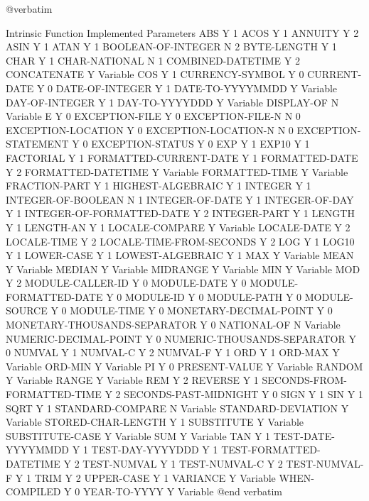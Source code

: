 @verbatim

Intrinsic Function		Implemented	Parameters
ABS				Y		1
ACOS				Y		1
ANNUITY				Y		2
ASIN				Y		1
ATAN				Y		1
BOOLEAN-OF-INTEGER		N		2
BYTE-LENGTH			Y		1
CHAR				Y		1
CHAR-NATIONAL			N		1
COMBINED-DATETIME		Y		2
CONCATENATE			Y		Variable
COS				Y		1
CURRENCY-SYMBOL			Y		0
CURRENT-DATE			Y		0
DATE-OF-INTEGER			Y		1
DATE-TO-YYYYMMDD		Y		Variable
DAY-OF-INTEGER			Y		1
DAY-TO-YYYYDDD			Y		Variable
DISPLAY-OF			N		Variable
E				Y		0
EXCEPTION-FILE			Y		0
EXCEPTION-FILE-N		N		0
EXCEPTION-LOCATION		Y		0
EXCEPTION-LOCATION-N		N		0
EXCEPTION-STATEMENT		Y		0
EXCEPTION-STATUS		Y		0
EXP				Y		1
EXP10				Y		1
FACTORIAL			Y		1
FORMATTED-CURRENT-DATE		Y		1
FORMATTED-DATE			Y		2
FORMATTED-DATETIME		Y		Variable
FORMATTED-TIME			Y		Variable
FRACTION-PART			Y		1
HIGHEST-ALGEBRAIC		Y		1
INTEGER				Y		1
INTEGER-OF-BOOLEAN		N		1
INTEGER-OF-DATE			Y		1
INTEGER-OF-DAY			Y		1
INTEGER-OF-FORMATTED-DATE	Y		2
INTEGER-PART			Y		1
LENGTH				Y		1
LENGTH-AN			Y		1
LOCALE-COMPARE			Y		Variable
LOCALE-DATE			Y		2
LOCALE-TIME			Y		2
LOCALE-TIME-FROM-SECONDS	Y		2
LOG				Y		1
LOG10				Y		1
LOWER-CASE			Y		1
LOWEST-ALGEBRAIC		Y		1
MAX				Y		Variable
MEAN				Y		Variable
MEDIAN				Y		Variable
MIDRANGE			Y		Variable
MIN				Y		Variable
MOD				Y		2
MODULE-CALLER-ID		Y		0
MODULE-DATE			Y		0
MODULE-FORMATTED-DATE		Y		0
MODULE-ID			Y		0
MODULE-PATH			Y		0
MODULE-SOURCE			Y		0
MODULE-TIME			Y		0
MONETARY-DECIMAL-POINT		Y		0
MONETARY-THOUSANDS-SEPARATOR	Y		0
NATIONAL-OF			N		Variable
NUMERIC-DECIMAL-POINT		Y		0
NUMERIC-THOUSANDS-SEPARATOR	Y		0
NUMVAL				Y		1
NUMVAL-C			Y		2
NUMVAL-F			Y		1
ORD				Y		1
ORD-MAX				Y		Variable
ORD-MIN				Y		Variable
PI				Y		0
PRESENT-VALUE			Y		Variable
RANDOM				Y		Variable
RANGE				Y		Variable
REM				Y		2
REVERSE				Y		1
SECONDS-FROM-FORMATTED-TIME	Y		2
SECONDS-PAST-MIDNIGHT		Y		0
SIGN				Y		1
SIN				Y		1
SQRT				Y		1
STANDARD-COMPARE		N		Variable
STANDARD-DEVIATION		Y		Variable
STORED-CHAR-LENGTH		Y		1
SUBSTITUTE			Y		Variable
SUBSTITUTE-CASE			Y		Variable
SUM				Y		Variable
TAN				Y		1
TEST-DATE-YYYYMMDD		Y		1
TEST-DAY-YYYYDDD		Y		1
TEST-FORMATTED-DATETIME		Y		2
TEST-NUMVAL			Y		1
TEST-NUMVAL-C			Y		2
TEST-NUMVAL-F			Y		1
TRIM				Y		2
UPPER-CASE			Y		1
VARIANCE			Y		Variable
WHEN-COMPILED			Y		0
YEAR-TO-YYYY			Y		Variable
@end verbatim

